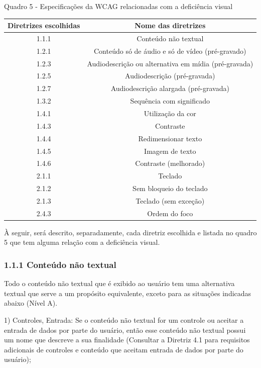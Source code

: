 \documentclass[a4paper]{article}
\begin{document}
\begin{titlepage}
Quadro 5 - Especificações da WCAG relacionadas com a deficiência visual\\[-1cm]
\begin{center}
	\begin{longtable}{|c|c|}
		\hline
		Diretrizes escolhidas & Nome das diretrizes\\
		\hline
		1.1.1 & Conteúdo não textual\\
		\hline
		1.2.1 & Conteúdo só de áudio e só de vídeo (pré-gravado)\\
		\hline
		1.2.3 & Audiodescrição ou alternativa em mídia (pré-gravada)\\
		\hline
		1.2.5 & Audiodescrição (pré-gravada)\\
		\hline
		1.2.7 & Audiodescrição alargada (pré-gravada)\\
		\hline
		1.3.2 & Sequência com significado\\
		\hline
		1.4.1 & Utilização da cor\\
		\hline
		1.4.3 & Contraste\\
		\hline
		1.4.4 & Redimensionar texto\\
		\hline
		1.4.5 & Imagem de texto\\
		\hline
		1.4.6 & Contraste (melhorado)\\
		\hline
		2.1.1 & Teclado\\
		\hline
		2.1.2 & Sem bloqueio do teclado\\
		\hline
		2.1.3 & Teclado (sem exceção)\\
		\hline
		2.4.3 & Ordem do foco\\
		\hline
	\end{longtable}
\end{center}

À seguir, será descrito, separadamente, cada diretriz escolhida e listada no quadro 5 que tem alguma relação com a deficiência visual.

\subsubsection{1.1.1 Conteúdo não textual}

Todo o conteúdo não textual que é exibido ao usuário tem uma alternativa textual que serve a um propósito equivalente, exceto para as situações indicadas abaixo (Nível A).\\

\hspace{.1\textwidth} %
\begin{minipage}{.85\textwidth}
	1) Controles, Entrada: Se o conteúdo não textual for um controle ou aceitar a entrada de dados por parte do usuário, então esse conteúdo não textual possui um nome que descreve a sua finalidade (Consultar a Diretriz 4.1 para requisitos adicionais de controles e conteúdo que aceitam entrada de dados por parte do usuário);\\
\end{minipage}


\end{titlepage}
\end{document}
